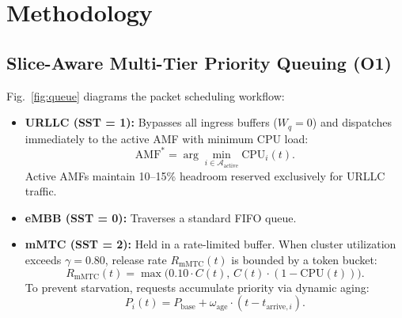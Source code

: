 \documentclass[conference]{IEEEtran}
\begin{document}
\section{Methodology}

\subsection{Slice-Aware Multi-Tier Priority Queuing (O1)}
Fig.~\ref{fig:queue} diagrams the packet scheduling workflow:
\begin{itemize}
  \item \textbf{URLLC (SST = 1):} Bypasses all ingress buffers ($W_q = 0$) and dispatches immediately to the active AMF with minimum CPU load:
  \begin{equation}
  \text{AMF}^* = \arg\min_{i \in \mathcal{A}_{\text{active}}} \text{CPU}_i(t).
  \end{equation}
  Active AMFs maintain 10--15\% headroom reserved exclusively for URLLC traffic.
  \item \textbf{eMBB (SST = 0):} Traverses a standard FIFO queue.
  \item \textbf{mMTC (SST = 2):} Held in a rate-limited buffer. When cluster utilization exceeds $\gamma = 0.80$, release rate $R_{\text{mMTC}}(t)$ is bounded by a token bucket:
  \begin{equation}
  R_{\text{mMTC}}(t) = \max\Big(0.10 \cdot C(t), \, C(t) \cdot (1 - \text{CPU}(t))\Big).
  \end{equation}
  To prevent starvation, requests accumulate priority via dynamic aging:
  \begin{equation}
  P_i(t) = P_{\text{base}} + \omega_{\text{age}} \cdot (t - t_{\text{arrive}, i}).
  \end{equation}
\end{itemize}
\end{document}
